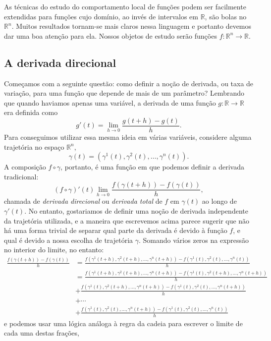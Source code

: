 \documentclass[a4paper, 12pt]{article}
\theoremstyle{definition}
\theoremstyle{definition}
\begin{document}
As técnicas do estudo do comportamento local de funções podem ser facilmente extendidas para funções cujo
domínio, ao invés de intervalos em $\mathbb R$, são bolas no $\mathbb R^n$. Muitos resultados tornam-se 
mais claros nessa linguagem e portanto devemos dar uma boa atenção para ela. Nossos objetos de estudo serão
funções $f:\mathbb R^n\rightarrow\mathbb R$.

\subsection{A derivada direcional}

Começamos com a seguinte questão: como definir a noção de derivada, ou taxa de variação, para uma função que
depende de mais de um parâmetro? Lembrando que quando haviamos apenas uma variável, a derivada de uma função
$g:\mathbb R\rightarrow\mathbb R$ era definida como
$$g'(t)=\lim\limits_{h\rightarrow0}\frac{g(t+h)-g(t)}{h}.$$
Para conseguimos utilizar essa mesma ideia em várias variáveis, considere alguma trajetória no espaço 
$\mathbb R^n$,
$$\gamma(t)=(\gamma^1(t),\gamma^2(t),\dots,\gamma^n(t)).$$
A composição $f\circ\gamma$, portanto, é uma função em que podemos definir a derivada tradicional:
$$(f\circ\gamma)'(t)\lim\limits_{h\rightarrow0}\frac{f(\gamma(t+h))-f(\gamma(t))}{h},$$
chamada de \textit{derivada direcional} ou \textit{derivada total} de $f$ em $\gamma(t)$ ao longo de $\gamma'(t)$. 
No entanto, gostariamos de definir uma noção de derivada independente da trajetória utilizada, e a maneira 
que escrevemos acima parece sugerir que não há uma forma trivial de separar qual parte da derivada é devido à função $f$,
e qual é devido a nossa escolha de trajetória $\gamma$. Somando vários zeros na expressão no interior do limite, 
no entanto:
\begin{align*}
    \frac{f(\gamma(t+h))-f(\gamma(t))}{h}
    &=\frac{f(\gamma^1(t+h),\gamma^2(t+h),\dots,\gamma^n(t+h))-f(\gamma^1(t),\gamma^2(t),\dots,\gamma^n(t))}{h}\\
    &=\frac{f(\gamma^1(t+h),\gamma^2(t+h),\dots,\gamma^n(t+h))-f(\gamma^1(t),\gamma^2(t+h),\dots,\gamma^n(t+h))}{h}\\
    &+\frac{f(\gamma^1(t),\gamma^2(t+h),\dots,\gamma^n(t+h))-f(\gamma^1(t),\gamma^2(t),\dots,\gamma^n(t+h))}{h}\\
    &+\cdots\\
    &+\frac{f(\gamma^1(t),\gamma^2(t),\dots,\gamma^n(t+h))-f(\gamma^1(t),\gamma^2(t),\dots,\gamma^n(t))}{h}
\end{align*}
e podemos usar uma lógica análoga à regra da cadeia para escrever o limite de cada uma destas frações,
\end{document}
